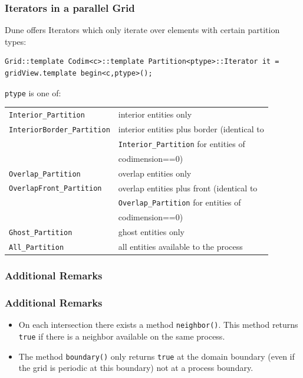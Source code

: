 \begin{frame}[fragile]
  \frametitle<presentation>{Iterators in a parallel Grid}
  \small
  Dune offers Iterators which only iterate over elements with certain partition types:\\
\begin{lstlisting}
Grid::template Codim<c>::template Partition<ptype>::Iterator it = gridView.template begin<c,ptype>();
\end{lstlisting}

\lstinline!ptype! is one of:
  \begin{center}
    \begin{tabular}{ll}
      \texttt{Interior\_Partition} & interior entities only\\
      \texttt{InteriorBorder\_Partition} & interior entities plus border (identical to \\
                                         & \texttt{Interior\_Partition} for entities of \\
                                         & codimension==0)\\
      \texttt{Overlap\_Partition} & overlap entities only\\
      \texttt{OverlapFront\_Partition} & overlap entities plus front (identical to \\
                                       & \texttt{Overlap\_Partition} for entities of \\
                                       & codimension==0)\\
      \texttt{Ghost\_Partition} & ghost entities only\\
      \texttt{All\_Partition} & all entities available to the process
    \end{tabular}
  \end{center}
\end{frame}

\subsubsection{Additional Remarks}

\begin{frame}
\frametitle<presentation>{Additional Remarks}
\begin{itemize}
\item On each intersection there exists a method \lstinline!neighbor()!. This method returns \lstinline!true! if there is a 
neighbor available on the same process.
\item The method \lstinline!boundary()! only returns \lstinline!true! at the domain boundary (even if the grid is periodic at this boundary) not at a process boundary.
\end{itemize}
\end{frame}

